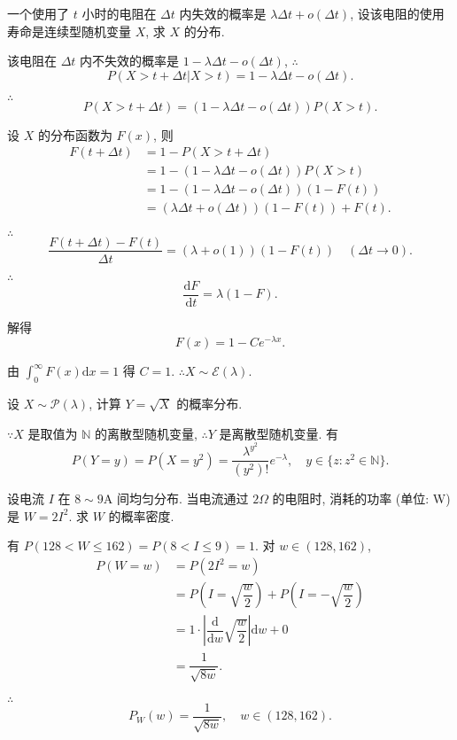 \documentclass[color=black,device=normal,lang=cn]{elegantnote}
\numberwithin{equation}{section}
\theoremstyle{plain}
\numberwithin{exercise}{exsection}
\begin{document}
\addtocounter{exercise}{3}
\begin{exercise}%
    一个使用了 $t$ 小时的电阻在 $\Delta t$ 内失效的概率是 $\lambda\Delta t+o(\Delta t)$, 设该电阻的使用寿命是连续型随机变量 $X$, 求 $X$ 的分布.
\end{exercise}
\begin{solution}
    该电阻在 $\Delta t$ 内不失效的概率是 $1-\lambda\Delta t-o(\Delta t)$, $\therefore$
    \[P(X>t+\Delta t|X>t)=1-\lambda\Delta t-o(\Delta t).\]

    $\therefore$
    \[P(X>t+\Delta t)=(1-\lambda\Delta t-o(\Delta t))P(X>t).\]

    设 $X$ 的分布函数为 $F(x)$, 则
    \begin{align*}
        F(t+\Delta t) & =1-P(X>t+\Delta t) \\
        & =1-(1-\lambda\Delta t-o(\Delta t))P(X>t) \\
        & =1-(1-\lambda\Delta t-o(\Delta t))(1-F(t)) \\
        & =(\lambda\Delta t+o(\Delta t))(1-F(t))+F(t).
    \end{align*}

    $\therefore$
    \[\dfrac{F(t+\Delta t)-F(t)}{\Delta t}=(\lambda+o(1))(1-F(t))\quad(\Delta t\to0).\]

    $\therefore$
    \[\dfrac{\mathrm{d}F}{\mathrm{d}t}=\lambda(1-F).\]

    解得
    \[F(x)=1-Ce^{-\lambda x}.\]

    由 $\int_0^\infty F(x)\mathrm{d}x=1$ 得 $C=1$. $\therefore X\sim\mathcal{E}(\lambda)$.
\end{solution}
\begin{exercise}%
    设 $X\sim\mathcal{P}(\lambda)$, 计算 $Y=\sqrt{X}$ 的概率分布.
\end{exercise}
\begin{solution}
    $\because X$ 是取值为 $\mathbb{N}$ 的离散型随机变量, $\therefore Y$ 是离散型随机变量. 有
    \[P(Y=y)=P(X=y^2)=\dfrac{\lambda^{y^2}}{(y^2)!}e^{-\lambda},\quad y\in\{z:z^2\in\mathbb{N}\}.\]
\end{solution}
\begin{exercise}%
    设电流 $I$ 在 $8\sim 9\text{A}$ 间均匀分布. 当电流通过 $2\Omega$ 的电阻时, 消耗的功率 (单位: W) 是 $W=2I^2$. 求 $W$ 的概率密度.
\end{exercise}
\begin{solution}
    有 $P(128<W\leq162)=P(8<I\leq9)=1$. 对 $w\in(128,162)$,
    \begin{align*}
        P(W=w) & =P(2I^2=w) \\
        & =P\left(I=\sqrt{\dfrac{w}{2}}\right)+P\left(I=-\sqrt{\dfrac{w}{2}}\right) \\
        & =1\cdot\left|\dfrac{\mathrm{d}}{\mathrm{d}w}\sqrt{\dfrac{w}{2}}\right|\mathrm{d}w+0 \\
        & =\dfrac{1}{\sqrt{8w}}.
    \end{align*}

    $\therefore$
    \[P_W(w)=\dfrac{1}{\sqrt{8w}},\quad w\in(128,162).\]
\end{solution}
\end{document}
